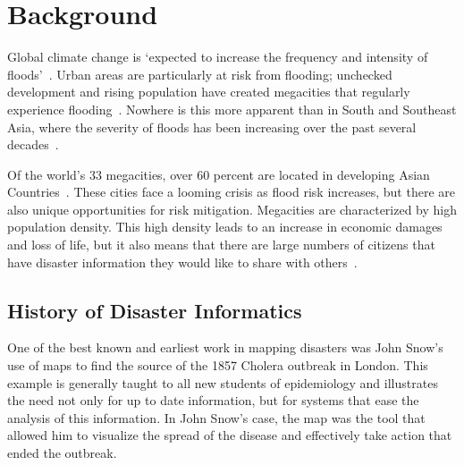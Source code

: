 \chapter{Background}

Global climate change is
`expected to increase the frequency and intensity of
floods'~\cite{ahernGlobalHealthImpacts2005}.  Urban areas are particularly at
risk from flooding; unchecked development and rising population have created
megacities that regularly experience flooding~\cite{chanFloodRiskAsia2012}.
Nowhere is this more apparent than in South and Southeast Asia, where the
severity of floods has been increasing over the past several
decades~\cite{tortiFloodsSoutheastAsia2012}.

Of the world's 33 megacities, over 60 percent are located in developing Asian
Countries~\cite{unitednationsdepartmentofeconomicandsocialaffairsWorldCities20162016}.
These cities face a looming crisis as flood risk increases, but there are also
unique opportunities for risk mitigation. Megacities are characterized by high
population density. This high density leads to an increase in economic damages
and loss of life, but it also means that there are large numbers of citizens
that have disaster information they would like to share with
others~\cite{chanFloodRiskAsia2012}.

\section{History of Disaster Informatics} One of the best known and earliest
work in mapping disasters was John Snow's use of maps to find the
source of the 1857 Cholera outbreak in London\cite{rogersJohnSnowData2013}. This
example is generally taught to all new students of epidemiology and illustrates
the need not only for up to date information, but for systems that ease the
analysis of this information. In John Snow's case, the map was the tool that
allowed him to visualize the spread of the disease and effectively take action
that ended the outbreak.

